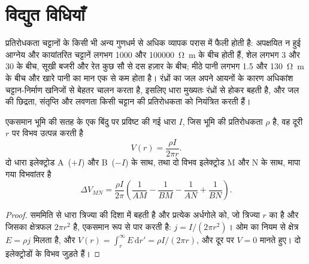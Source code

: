 \section{विद्युत विधियाँ}\label{sec:b3:field-lab-methods-3:electrical}

प्रतिरोधकता चट्टानों के किसी भी अन्य गुणधर्म से अधिक व्यापक परास में फैली होती है:
अपक्षयित न हुई आग्नेय और कायांतरित चट्टानें लगभग
\num{1000} और \qty{100000}{\ohm\metre} के बीच होती हैं, शेल लगभग
\num{3} और \num{30} के बीच, सूखी बजरी और रेत कुछ सौ से दस
हज़ार के बीच; मीठे पानी लगभग \num{1.5} और
\qty{130}{\ohm\metre} के बीच और खारे पानी का मान एक से कम होता है। रंध्रों का जल
अपने आयनों के कारण अधिकांश चट्टान-निर्माण खनिजों से बेहतर चालन करता है, इसलिए धारा
मुख्यतः रंध्रों से होकर बहती है, और जल की छिद्रता, संतृप्ति और
लवणता किसी चट्टान की प्रतिरोधकता को नियंत्रित करती हैं।

\begin{theorem}[एकसमान भूमि पर बिंदु स्रोत]\label{thm:b3:field-lab-methods-3:point-source}
एकसमान भूमि की सतह के एक बिंदु पर प्रविष्ट की गई धारा $I$, जिस भूमि की
प्रतिरोधकता $\rho$ है, वह दूरी $r$ पर विभव उत्पन्न करती है
\[
V(r) = \frac{\rho I}{2\pi r} .
\]
दो धारा इलेक्ट्रोड A~($+I$) और B~($-I$) के साथ, तथा दो विभव इलेक्ट्रोड
M और N के साथ, मापा गया विभवांतर है
\[
\Delta V_{MN} = \frac{\rho I}{2\pi}\left(\frac{1}{AM} - \frac{1}{BM}
               - \frac{1}{AN} + \frac{1}{BN}\right) .
\]
\end{theorem}

\begin{proof}
सममिति से धारा त्रिज्या की दिशा में बहती है और प्रत्येक अर्धगोले को,
जो त्रिज्या $r$ का है और जिसका क्षेत्रफल $2\pi r^2$ है, एकसमान रूप से पार करती है: $j = I/(2\pi r^2)$। ओम का नियम
से क्षेत्र $E = \rho j$ मिलता है, और $V(r) = \int_r^\infty E\,\mathrm{d}r'
= \rho I/(2\pi r)$, और दूर पर $V = 0$ मानते हुए। दो इलेक्ट्रोडों के
विभव जुड़ते हैं।
\end{proof}

